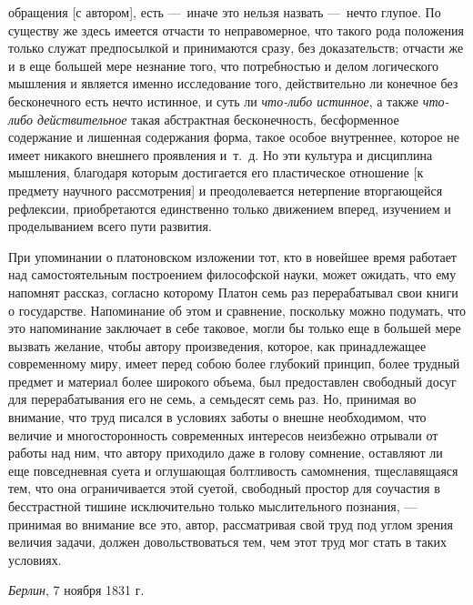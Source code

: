 обращения [с автором], есть —~иначе это нельзя назвать —~нечто глупое. По
существу же здесь имеется отчасти то неправомерное, что такого рода
положения только служат предпосылкой и принимаются сразу, без
доказательств; отчасти же и в еще большей мере незнание того, что
потребностью и делом логического мышления и является именно исследование
того, действительно ли конечное без бесконечного есть нечто истинное, и
суть ли {\em что-либо истинное}, а также
{\em что-либо действительное} такая абстрактная
бесконечность, бесформенное содержание и лишенная содержания форма, такое
особое внутреннее, которое не имеет никакого внешнего проявления и~т.~д. Но
эти культура и дисциплина мышления, благодаря которым достигается его
пластическое отношение [к предмету научного рассмотрения] и преодолевается
нетерпение вторгающейся рефлексии, приобретаются единственно только
движением вперед, изучением и проделыванием всего пути развития.

При упоминании о платоновском изложении тот, кто в новейшее время работает
над самостоятельным построением философской науки, может ожидать, что ему
напомнят рассказ, согласно которому Платон семь раз перерабатывал свои
книги о государстве. Напоминание об этом и сравнение, поскольку можно
подумать, что это напоминание заключает в себе таковое, могли бы только еще
в большей мере вызвать желание, чтобы автору произведения, которое, как
принадлежащее современному миру, имеет перед собою более глубокий принцип,
более трудный предмет и материал более широкого объема, был предоставлен
свободный досуг для перерабатывания его не семь, а семьдесят семь раз. Но,
принимая во внимание, что труд писался в условиях заботы о внешне
необходимом, что величие и многосторонность современных интересов неизбежно
отрывали от работы над ним, что автору приходило даже в голову сомнение,
оставляют ли еще повседневная суета и оглушающая болтливость самомнения,
тщеславящаяся тем, что она ограничивается этой суетой, свободный простор
для соучастия в бесстрастной тишине исключительно только мыслительного
познания, — принимая во внимание все это, автор, рассматривая свой труд под
углом зрения величия задачи, должен довольствоваться тем, чем этот труд мог
стать в таких условиях.

{\em Берлин}, 7 ноября 1831 г.
\bigskip
